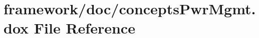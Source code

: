 \hypertarget{concepts_pwr_mgmt_8dox}{}\section{framework/doc/concepts\+Pwr\+Mgmt.dox File Reference}
\label{concepts_pwr_mgmt_8dox}

